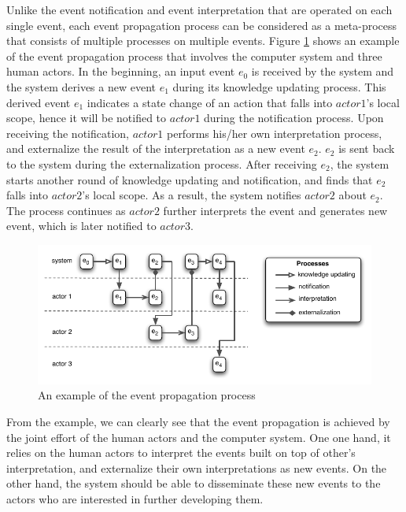 Unlike the event notification and event interpretation that are operated on each single event, each event propagation process can be considered as a meta-process that consists of multiple processes on multiple events. Figure \ref{fig:event_propagation} shows an example of the event propagation process that involves the computer system and three human actors. In the beginning, an input event $e_0$ is received by the system and the system derives a new event $e_1$ during its knowledge updating process. This derived event $e_1$ indicates a state change of an action that falls into $actor 1$'s local scope, hence it will be notified to $actor 1$ during the notification process. Upon receiving the notification, $actor 1$ performs his/her own interpretation process, and externalize the result of the interpretation as a new event $e_2$. $e_2$ is sent back to the system during the externalization process. After receiving $e_2$, the system starts another round of knowledge updating and notification, and finds that $e_2$ falls into $actor 2$'s local scope. As a result, the system notifies $actor 2$ about $e_2$. The process continues as $actor 2$ further interprets the event and generates new event, which is later notified to $actor 3$.

\begin{figure}[htbp] %
	\centering
	\includegraphics{event_propagation.pdf} 
	\caption{An example of the event propagation process}
	\label{fig:event_propagation}
\end{figure}

From the example, we can clearly see that the event propagation is achieved by the joint effort of the human actors and the computer system. One one hand, it relies on the human actors to interpret the events built on top of other's interpretation, and externalize their own interpretations as new events. On the other hand, the system should be able to disseminate these new events to the actors who are interested in further developing them.

